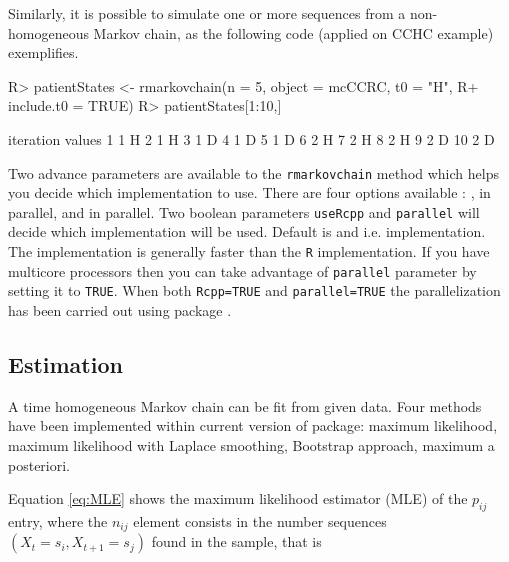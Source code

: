 \documentclass[
  nojss]{jss}
\begin{document}
Similarly, it is possible to simulate one or more sequences from a non-homogeneous Markov chain,
as the following code (applied on CCHC example) exemplifies.

\begin{CodeChunk}

\begin{CodeInput}
R> patientStates <- rmarkovchain(n = 5, object = mcCCRC, t0 = "H", 
R+                               include.t0 = TRUE)
R> patientStates[1:10,]
\end{CodeInput}

\begin{CodeOutput}
   iteration values
1          1      H
2          1      H
3          1      D
4          1      D
5          1      D
6          2      H
7          2      H
8          2      H
9          2      D
10         2      D
\end{CodeOutput}
\end{CodeChunk}

Two advance parameters are available to the \texttt{rmarkovchain} method which helps you decide which implementation to use. There are four options available : ,  in parallel,  and  in parallel. Two boolean parameters \texttt{useRcpp} and \texttt{parallel} will decide which implementation will be used. Default is  and  i.e.  implementation. The  implementation is generally faster than the \texttt{R} implementation. If you have multicore processors then you can take advantage of \texttt{parallel} parameter by setting it to \texttt{TRUE}. When both \texttt{Rcpp=TRUE} and \texttt{parallel=TRUE} the parallelization has been carried out using  package \citep{pkg:RcppParallel}.

\hypertarget{estimation}{%
\subsection{Estimation}\label{estimation}}

A time homogeneous Markov chain can be fit from given data. Four methods have been implemented within current version of  package: maximum likelihood, maximum likelihood with Laplace smoothing, Bootstrap approach, maximum a posteriori.

Equation \ref{eq:MLE} shows the maximum likelihood estimator (MLE) of the \(p_{ij}\) entry, where the \(n_{ij}\) element consists in the number sequences \(\left( X_{t}=s_{i}, X_{t+1}=s_{j}\right)\) found in the sample, that is
\end{document}
